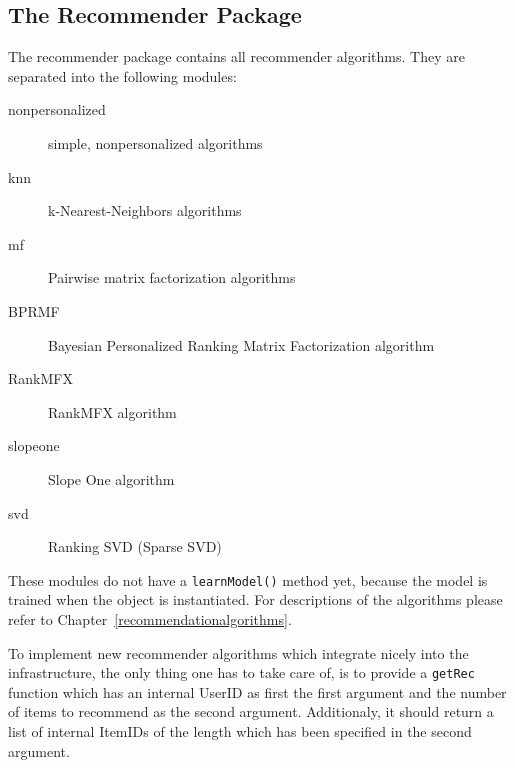 \subsection*{The Recommender Package}
The recommender package contains all recommender algorithms.
They are separated into the following modules:
\begin{description}
\item[nonpersonalized] simple, nonpersonalized algorithms
\item[knn] k-Nearest-Neighbors algorithms
\item[mf] Pairwise matrix factorization algorithms
\item[BPRMF] Bayesian Personalized Ranking Matrix Factorization algorithm
\item[RankMFX] RankMFX algorithm
\item[slopeone] Slope One algorithm
\item[svd] Ranking SVD (Sparse SVD)
\end{description}
These modules do not have a \lstinline!learnModel()! method yet, because the model is trained when the object is instantiated.
For descriptions of the algorithms please refer to Chapter~\ref{recommendationalgorithms}.

To implement new recommender algorithms which integrate nicely into the infrastructure,
the only thing one has
to take care of, is to provide a \lstinline!getRec! function which has an 
internal UserID as first the first argument and the number of items to recommend
as the second argument. Additionaly, it should return a list of internal ItemIDs of the
length which has been specified in the second argument.
